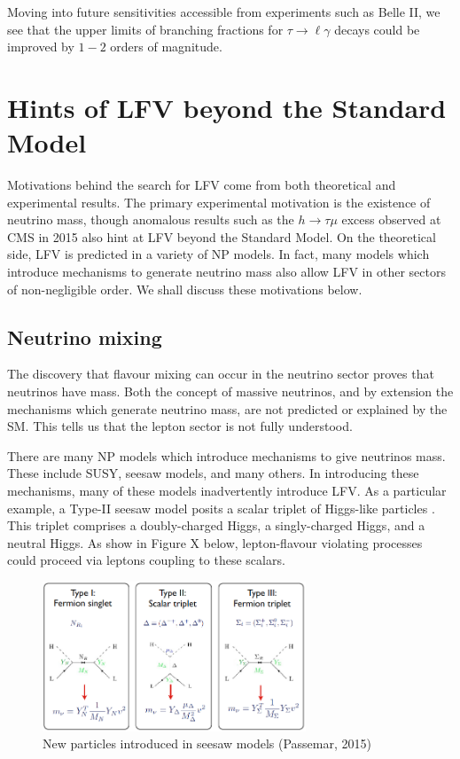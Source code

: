 \documentclass[12pt]{thesis}  %
\newcommand{\tlg}{\tau\to\ell\gamma}
\newcommand{\htm}{h\to \tau \mu}
\begin{document}
Moving into future sensitivities accessible from experiments such as Belle II, we see that the upper limits of branching fractions for $\tlg$ decays could be improved by $1-2$ orders of magnitude.

\section{Hints of LFV beyond the Standard Model}

Motivations behind the search for LFV come from both theoretical and experimental results. The primary experimental motivation is the existence of neutrino mass, though anomalous results such as the $\htm$ excess observed at CMS in 2015 also hint at LFV beyond the Standard Model. On the theoretical side, LFV is predicted in a variety of NP models. In fact, many models which introduce mechanisms to generate neutrino mass also allow LFV in other sectors of non-negligible order. We shall discuss these motivations below.

\subsection{Neutrino mixing}

The discovery that flavour mixing can occur in the neutrino sector \cite{Fukuda:1998}\cite{McGregor:2002} proves that neutrinos have mass. Both the concept of massive neutrinos, and by extension the mechanisms which generate neutrino mass, are not predicted or explained by the SM. This tells us that the lepton sector is not fully understood.

There are many NP models which introduce mechanisms to give neutrinos mass. These include SUSY, seesaw models, and many others. In introducing these mechanisms, many of these models inadvertently introduce LFV. As a particular example, a Type-II seesaw model posits a scalar triplet of Higgs-like particles \cite{Passemar:2015}. This triplet comprises a doubly-charged Higgs, a singly-charged Higgs, and a neutral Higgs. As show in Figure X below, lepton-flavour violating processes could proceed via leptons coupling to these scalars.


\begin{figure}[h]
\centering
\includegraphics[width=0.7\textwidth]{images/seesaw.png}
\caption[]%
{{\small New particles introduced in seesaw models (Passemar, 2015)}}
\label{}
\end{figure}
\end{document}
